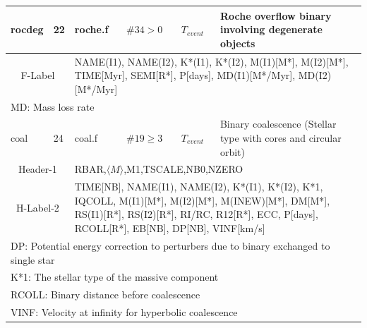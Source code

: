 \begin{longtable}{||p{0.42in}|p{0.25in}|p{0.6in}|p{0.6in}|p{0.4in}|p{2.3in}||}
   rocdeg  & 22  & roche.f    & $\#34>0$   & $T_{event}$    & Roche overflow binary involving degenerate objects \\\hline
\multicolumn{2}{|c|}{ F-Label } & \multicolumn{4}{|p{4.4in}|}{NAME(I1), NAME(I2), K*(I1), K*(I2), M(I1)[M*], M(I2)[M*], TIME[Myr], SEMI[R*], P[days], MD(I1)[M*/Myr], MD(I2)[M*/Myr] }\\\hline
\multicolumn{6}{|p{5.4in}|}{ MD: Mass loss rate }\\\hline\hline


   coal  & 24  & coal.f    & $\#19\geq3$   & $T_{event}$    & Binary coalescence (Stellar type with cores and circular orbit) \\\hline
\multicolumn{2}{|c|}{ Header-1 } & \multicolumn{4}{|p{4.4in}|}{RBAR,$\langle M\rangle$,M1,TSCALE,NB0,NZERO}\\\hline \multicolumn{2}{|c|}{ H-Label-2 } & \multicolumn{4}{|p{4.4in}|}{TIME[NB], NAME(I1), NAME(I2), K*(I1), K*(I2), K*1, IQCOLL, M(I1)[M*], M(I2)[M*], M(INEW)[M*], DM[M*], RS(I1)[R*], RS(I2)[R*], RI/RC, R12[R*], ECC, P[days], RCOLL[R*], EB[NB], DP[NB], VINF[km/s]}\\\hline
\multicolumn{6}{|p{5.4in}|}{DP: Potential energy correction to perturbers due to binary exchanged to single star}\\
\multicolumn{6}{|p{5.4in}|}{K*1: The stellar type of the massive component}\\
\multicolumn{6}{|p{5.4in}|}{RCOLL: Binary distance before coalescence}\\
\multicolumn{6}{|p{5.4in}|}{VINF: Velocity at infinity for hyperbolic coalescence }\\
\hline\hline


\end{longtable}
